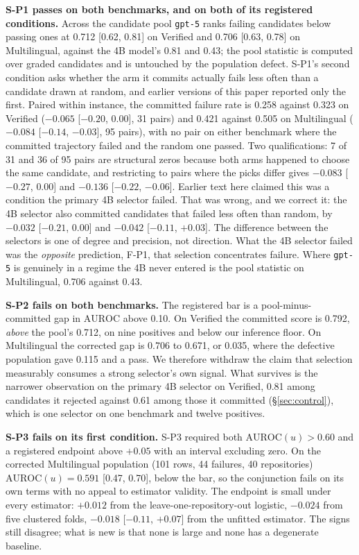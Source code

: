 \documentclass[11pt]{article}
\begin{document}
\textbf{S-P1 passes on both benchmarks, and on both of its registered conditions.} Across the candidate pool \texttt{gpt-5} ranks failing candidates below passing ones at 0.712 [0.62, 0.81] on Verified and 0.706 [0.63, 0.78] on Multilingual, against the 4B model's 0.81 and 0.43; the pool statistic is computed over graded candidates and is untouched by the population defect. S-P1's second condition asks whether the arm it commits actually fails less often than a candidate drawn at random, and earlier versions of this paper reported only the first. Paired within instance, the committed failure rate is 0.258 against 0.323 on Verified ($-0.065$ [$-0.20$, $0.00$], 31 pairs) and 0.421 against 0.505 on Multilingual ($-0.084$ [$-0.14$, $-0.03$], 95 pairs), with no pair on either benchmark where the committed trajectory failed and the random one passed. Two qualifications: 7 of 31 and 36 of 95 pairs are structural zeros because both arms happened to choose the same candidate, and restricting to pairs where the picks differ gives $-0.083$ [$-0.27$, $0.00$] and $-0.136$ [$-0.22$, $-0.06$]. Earlier text here claimed this was a condition the primary 4B selector failed. That was wrong, and we correct it: the 4B selector also committed candidates that failed less often than random, by $-0.032$ [$-0.21$, $0.00$] and $-0.042$ [$-0.11$, $+0.03$]. The difference between the selectors is one of degree and precision, not direction. What the 4B selector failed was the \emph{opposite} prediction, F-P1, that selection concentrates failure. Where \texttt{gpt-5} is genuinely in a regime the 4B never entered is the pool statistic on Multilingual, 0.706 against 0.43.

\textbf{S-P2 fails on both benchmarks.} The registered bar is a pool-minus-committed gap in $\mathrm{AUROC}$ above 0.10. On Verified the committed score is 0.792, \emph{above} the pool's 0.712, on nine positives and below our inference floor. On Multilingual the corrected gap is 0.706 to 0.671, or 0.035, where the defective population gave 0.115 and a pass. We therefore withdraw the claim that selection measurably consumes a strong selector's own signal. What survives is the narrower observation on the primary 4B selector on Verified, 0.81 among candidates it rejected against 0.61 among those it committed (\S\ref{sec:control}), which is one selector on one benchmark and twelve positives.

\textbf{S-P3 fails on its first condition.} S-P3 required both $\mathrm{AUROC}(u) > 0.60$ and a registered endpoint above $+0.05$ with an interval excluding zero. On the corrected Multilingual population (101 rows, 44 failures, 40 repositories) $\mathrm{AUROC}(u) = 0.591$ [0.47, 0.70], below the bar, so the conjunction fails on its own terms with no appeal to estimator validity. The endpoint is small under every estimator: $+0.012$ from the leave-one-repository-out logistic, $-0.024$ from five clustered folds, $-0.018$ [$-0.11$, $+0.07$] from the unfitted estimator. The signs still disagree; what is new is that none is large and none has a degenerate baseline.
\end{document}
